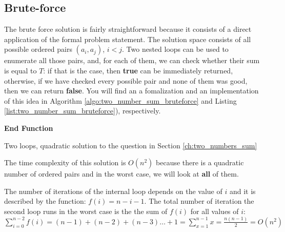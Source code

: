 \subsection{Brute-force}
\label{sec:two_numbers:bruteforce}

The brute force solution is fairly straightforward because it consists of a direct application of the formal problem statement. 
The solution space consists of all possible ordered pairs $(a_i,a_j)$, $i < j$. 
Two nested loops can be used to enumerate all those pairs, and, for each of them, we can check whether their sum is equal to $T$: if that is the case,
then   \textbf{true} can be immediately returned, otherwise, if we have checked every possible pair and none of them was good, then we can return  \textbf{false}.
You will find an a fomalization and an implementation of this idea in Algorithm \ref{algo:two_number_sum_bruteforce}
and Listing \ref{list:two_number_sum_bruteforce}), respectively.

\begin{algorithm}
	\SetAlgoLined {}
	
	 

	\textbf{End Function}
	
		\caption{Two loops, quadratic solution to the question in Section \ref{ch:two_numbers_sum} }
		\label{algo:two_number_sum_bruteforce}
\end{algorithm}




The time complexity of this solution is $O(n^2)$ because there is a quadratic number of
ordered pairs and in the worst case, we will look at \textbf{all} of them.

The number of iterations of the internal loop depends on the value of $i$ and
it is described by the function: $f(i) = n-i-1$. The total number of iteration the second
loop runs in the worst case is the the sum of $f(i)$ for all values of $i$: 
$\sum_{i=0}^{n-2} f(i) = (n-1) + (n-2) + (n-3) \ldots + 1 =\sum_{x=1}^{n-1} x= \frac{n(n-1)}{2} = O(n^2)$

